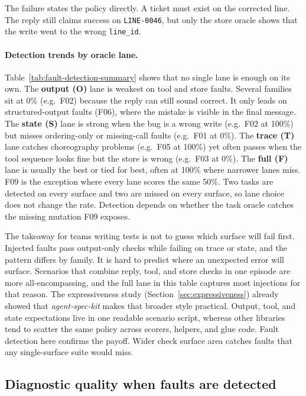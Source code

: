 The failure states the policy directly. A ticket must exist on the corrected line. The reply still claims success on \texttt{LINE-0046}, but only the store oracle shows that the write went to the wrong \texttt{line\_id}.

\paragraph{Detection trends by oracle lane.}
Table~\ref{tab:fault-detection-summary} shows that no single lane is enough on its own. The \textbf{output (O)} lane is weakest on tool and store faults. Several families sit at 0\% (e.g.\ F02) because the reply can still sound correct. It only leads on structured-output faults (F06), where the mistake is visible in the final message. The \textbf{state (S)} lane is strong when the bug is a wrong write (e.g.\ F02 at 100\%) but misses ordering-only or missing-call faults (e.g.\ F01 at 0\%). The \textbf{trace (T)} lane catches choreography problems (e.g.\ F05 at 100\%) yet often passes when the tool sequence looks fine but the store is wrong (e.g.\ F03 at 0\%). The \textbf{full (F)} lane is usually the best or tied for best, often at 100\% where narrower lanes miss. F09 is the exception where every lane scores the same 50\%. Two tasks are detected on every surface and two are missed on every surface, so lane choice does not change the rate. Detection depends on whether the task oracle catches the missing mutation F09 exposes.

The takeaway for teams writing tests is not to guess which surface will fail first. Injected faults pass output-only checks while failing on trace or state, and the pattern differs by family. It is hard to predict where an unexpected error will surface. Scenarios that combine reply, tool, and store checks in one episode are more all-encompassing, and the full lane in this table captures most injections for that reason. The expressiveness study (Section~\ref{sec:expressiveness}) already showed that \emph{agent-spec-kit} makes that broader style practical. Output, tool, and state expectations live in one readable scenario script, whereas other libraries tend to scatter the same policy across scorers, helpers, and glue code. Fault detection here confirms the payoff. Wider check surface area catches faults that any single-surface suite would miss.

\subsection{Diagnostic quality when faults are detected}
\label{sec:diagnostic-quality-faults}

